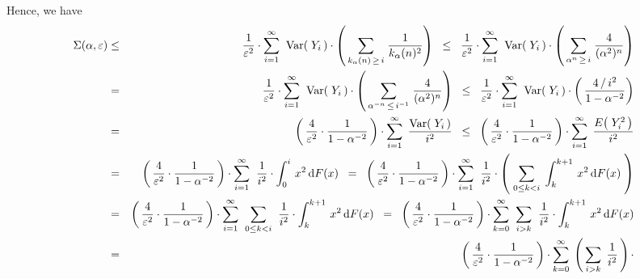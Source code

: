 \begin{enumerate}
Hence, we have
\begin{eqnarray*}
\Sigma(\alpha,\varepsilon)
& \leq &
	\dfrac{1}{\varepsilon^{2}} \cdot
	\overset{\infty}{\underset{i=1}{\sum}}\;\;
	\Var\!\left(\;Y_{i}\,\right)
		\cdot
		\left(\,
			\underset{k_{\alpha}(n)\,\geq\,i}{\sum}\;
			\dfrac{1}{k_{\alpha}(n)^{2}}
			\right)
	\;\; \leq \;\;
	\dfrac{1}{\varepsilon^{2}} \cdot
	\overset{\infty}{\underset{i=1}{\sum}}\;\;
	\Var\!\left(\;Y_{i}\,\right)
		\cdot
		\left(\,
			\underset{\alpha^{n}\,\geq\,i}{\sum}\;
			\dfrac{4}{(\alpha^{2})^{n}}
			\right)
\\
& = &
	\dfrac{1}{\varepsilon^{2}} \cdot
	\overset{\infty}{\underset{i=1}{\sum}}\;\;
	\Var\!\left(\;Y_{i}\,\right)
		\cdot
		\left(\,
			\underset{\alpha^{-n}\,\leq\,i^{-1}}{\sum}\;
			\dfrac{4}{(\alpha^{2})^{n}}
			\right)
	\;\; \leq \;\;
	\dfrac{1}{\varepsilon^{2}} \cdot
	\overset{\infty}{\underset{i=1}{\sum}}\;\;
	\Var\!\left(\;Y_{i}\,\right)
		\cdot
		\left(\,
			\dfrac{4\,/\,i^{2}}{1-\alpha^{-2}}
			\right)
\\
& = &
	\left(\,\dfrac{4}{\varepsilon^{2}} \cdot \dfrac{1}{1-\alpha^{-2}}\,\right) \cdot
	\overset{\infty}{\underset{i=1}{\sum}}\;\,
	\dfrac{\Var\!\left(\;Y_{i}\,\right)}{i^{2}}
	\;\; \leq \;\;
	\left(\,\dfrac{4}{\varepsilon^{2}} \cdot \dfrac{1}{1-\alpha^{-2}}\,\right) \cdot
	\overset{\infty}{\underset{i=1}{\sum}}\;\,
	\dfrac{E\!\left(\;Y_{i}^{2}\,\right)}{i^{2}}
\\
& = &
	\left(\,\dfrac{4}{\varepsilon^{2}} \cdot \dfrac{1}{1-\alpha^{-2}}\,\right) \cdot
	\overset{\infty}{\underset{i=1}{\sum}}\;\;
	\dfrac{1}{i^{2}} \cdot \int_{0}^{i}\, x^{2} \,\d F(x)
	\;\; = \;\;
	\left(\,\dfrac{4}{\varepsilon^{2}} \cdot \dfrac{1}{1-\alpha^{-2}}\,\right) \cdot
	\overset{\infty}{\underset{i=1}{\sum}}\;\;
	\dfrac{1}{i^{2}} \cdot 
	\left(\;
		\underset{0 \leq k < i}{\sum}\;\int_{k}^{k+1}\, x^{2} \,\d F(x)
		\;\right)
\\
& = &
	\left(\,\dfrac{4}{\varepsilon^{2}} \cdot \dfrac{1}{1-\alpha^{-2}}\,\right) \cdot
	\overset{\infty}{\underset{i=1}{\sum}}\;\;
	\underset{0 \leq k < i}{\sum}\;\;
	\dfrac{1}{i^{2}} \cdot  \int_{k}^{k+1}\, x^{2} \,\d F(x)
	\;\; = \;\;
	\left(\,\dfrac{4}{\varepsilon^{2}} \cdot \dfrac{1}{1-\alpha^{-2}}\,\right) \cdot
	\overset{\infty}{\underset{k=0}{\sum}}\;\;
	\underset{i > k}{\sum}\;\;
	\dfrac{1}{i^{2}} \cdot  \int_{k}^{k+1}\, x^{2} \,\d F(x)
\\
& = &
	\left(\,\dfrac{4}{\varepsilon^{2}} \cdot \dfrac{1}{1-\alpha^{-2}}\,\right) \cdot
	\overset{\infty}{\underset{k=0}{\sum}}\;
	\left(\,\underset{i > k}{\sum}\;\, \dfrac{1}{i^{2}}\,\right) \cdot

\end{eqnarray*}
\end{enumerate}
